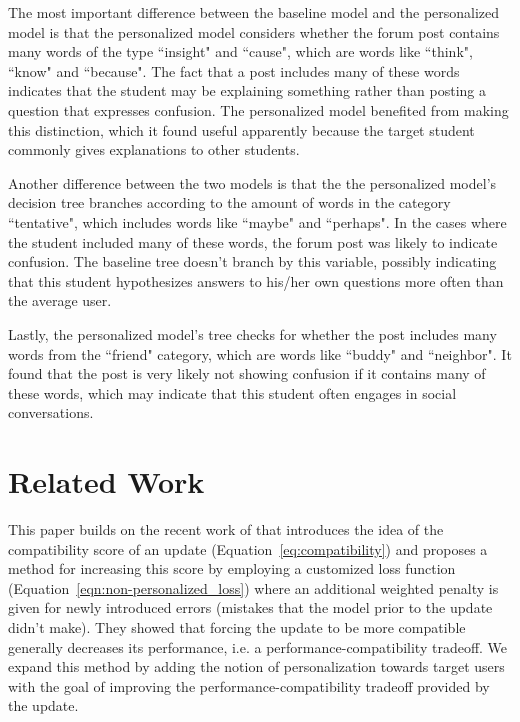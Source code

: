\documentclass[letterpaper]{article} %
\theoremstyle{definition}
\begin{document}
The most important difference between the baseline model and the personalized model is that the personalized model considers whether the forum post contains many words of the type ``insight" and ``cause", which are words like ``think", ``know" and ``because".
The fact that a post includes many of these words indicates that the student may be explaining something rather than posting a question that expresses confusion.
The personalized model benefited from making this distinction, which it found useful apparently because the target student commonly gives explanations to other students.

Another difference between the two models is that the  the personalized model's decision tree branches according to the amount of words in the category ``tentative", which includes words like ``maybe" and ``perhaps". In the cases where the student included many of these words, the forum post was likely to indicate confusion.
The baseline tree doesn't branch by this variable, possibly indicating that this student hypothesizes answers to his/her own questions more often than the average user.

Lastly, the personalized model's tree checks for whether the post includes many words from the ``friend" category, which are words like ``buddy" and ``neighbor". It found that the post is very likely not showing confusion if it contains many of these words, which may indicate that this student often engages in social conversations.
%
\section{Related Work}

This paper builds on the recent work of \citet{bansal2019updates} that introduces the idea of the compatibility score of an update (Equation~\ref{eq:compatibility}) and proposes a method for increasing this score by employing a customized loss function (Equation~\ref{eqn:non-personalized_loss}) where an additional weighted penalty is given for newly introduced errors (mistakes that the model prior to the update didn't make). They showed that forcing the update to be more compatible generally decreases its performance, i.e. a performance-compatibility tradeoff. We expand this method by adding the notion of personalization towards target users with the goal of improving the performance-compatibility tradeoff provided by the update. %
\end{document}

